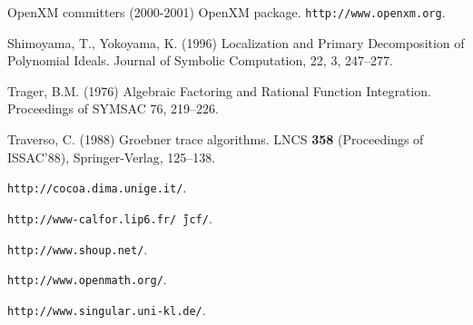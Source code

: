 \documentclass[runningheads]{cl2emult}
\begin{document}
\begin{thebibliography}{7}
OpenXM committers (2000-2001)
OpenXM package.
{\tt http://www.openxm.org}.

Shimoyama, T., Yokoyama, K. (1996)
Localization and Primary Decomposition of Polynomial Ideals.
Journal of Symbolic Computation, 22, 3, 247--277.

Trager, B.M. (1976)
Algebraic Factoring and Rational Function Integration.
Proceedings of SYMSAC 76, 219--226.

Traverso, C. (1988)
Groebner trace algorithms.
LNCS {\bf 358} (Proceedings of ISSAC'88), Springer-Verlag, 125--138.

{\tt http://cocoa.dima.unige.it/}.

{\tt http://www-calfor.lip6.fr/\~\,jcf/}.

{\tt http://www.shoup.net/}.

{\tt http://www.openmath.org/}.

{\tt http://www.singular.uni-kl.de/}.

\end{thebibliography}

\clearpage
{}
\flushbottom
\printindex
\end{document}
